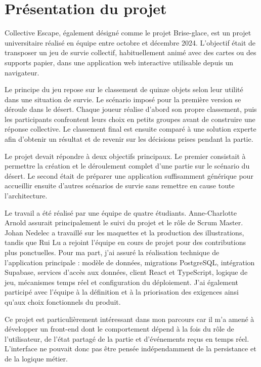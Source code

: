 \section{Présentation du projet}

Collective Escape, également désigné comme le projet Brise-glace, est un projet universitaire réalisé en équipe entre octobre et décembre 2024. L'objectif était de transposer un jeu de survie collectif, habituellement animé avec des cartes ou des supports papier, dans une application web interactive utilisable depuis un navigateur.

Le principe du jeu repose sur le classement de quinze objets selon leur utilité dans une situation de survie. Le scénario imposé pour la première version se déroule dans le désert. Chaque joueur réalise d'abord son propre classement, puis les participants confrontent leurs choix en petits groupes avant de construire une réponse collective. Le classement final est ensuite comparé à une solution experte afin d'obtenir un résultat et de revenir sur les décisions prises pendant la partie.

Le projet devait répondre à deux objectifs principaux. Le premier consistait à permettre la création et le déroulement complet d'une partie sur le scénario du désert. Le second était de préparer une application suffisamment générique pour accueillir ensuite d'autres scénarios de survie sans remettre en cause toute l'architecture.

Le travail a été réalisé par une équipe de quatre étudiants. Anne-Charlotte Arnold assurait principalement le suivi du projet et le rôle de Scrum Master. Johan Nedelec a travaillé sur les maquettes et la production des illustrations, tandis que Rui Lu a rejoint l'équipe en cours de projet pour des contributions plus ponctuelles. Pour ma part, j'ai assuré la réalisation technique de l'application principale : modèle de données, migrations PostgreSQL, intégration Supabase, services d'accès aux données, client React et TypeScript, logique de jeu, mécanismes temps réel et configuration du déploiement. J'ai également participé avec l'équipe à la définition et à la priorisation des exigences ainsi qu'aux choix fonctionnels du produit.

Ce projet est particulièrement intéressant dans mon parcours car il m'a amené à développer un front-end dont le comportement dépend à la fois du rôle de l'utilisateur, de l'état partagé de la partie et d'événements reçus en temps réel. L'interface ne pouvait donc pas être pensée indépendamment de la persistance et de la logique métier.

